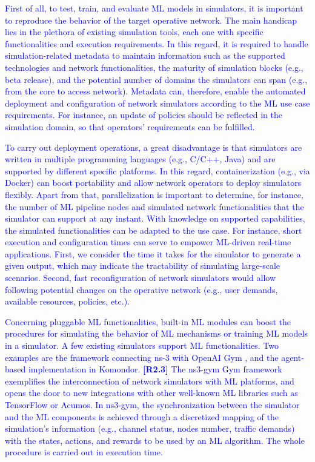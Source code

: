 \documentclass[journal]{IEEEtran}
\begin{document}
	\textcolor{blue}{First of all, to test, train, and evaluate ML models in simulators, it is important to reproduce the behavior of the target operative network. The main handicap lies in the plethora of existing simulation tools, each one with specific functionalities and execution requirements. In this regard, it is required to handle simulation-related metadata to maintain information such as the supported technologies and network functionalities, the maturity of simulation blocks (e.g., beta release), and the potential number of domains the simulators can span (e.g., from the core to access network). Metadata can, therefore, enable the automated deployment and configuration of network simulators according to the ML use case requirements. For instance, an update of policies should be reflected in the simulation domain, so that operators' requirements can be fulfilled.}
	
	\textcolor{blue}{To carry out deployment operations, a great disadvantage is that simulators are written in multiple programming languages (e.g., C/C++, Java) and are supported by different specific platforms. In this regard, containerization (e.g., via Docker) can boost portability and allow network operators to deploy simulators flexibly. Apart from that, parallelization is important to determine, for instance, the number of ML pipeline nodes and simulated network functionalities that the simulator can support at any instant.} \textcolor{blue}{With knowledge on supported capabilities, the simulated functionalities can be adapted to the use case. For instance, short execution and configuration times can serve to empower ML-driven real-time applications. First, we consider the time it takes for the simulator to generate a given output, which may indicate the tractability of simulating large-scale scenarios. Second, fast reconfiguration of network simulators would allow following potential changes on the operative network (e.g., user demands, available resources, policies, etc.).} 
 		
	\textcolor{blue}{Concerning pluggable ML functionalities, built-in ML modules can boost the procedures for simulating the behavior of ML mechanisms or training ML models in a simulator. A few existing simulators support ML functionalities. Two examples are the framework connecting ns-3 with OpenAI Gym \cite{gawlowicz2019ns}, and the agent-based implementation in Komondor. \textbf{[R2.3]} The ns3-gym Gym framework exemplifies the interconnection of network simulators with ML platforms, and opens the door to new integrations with other well-known ML libraries such as TensorFlow or Acumos. In ns3-gym, the synchronization between the simulator and the ML components is achieved through a discretized mapping of the simulation's information (e.g., channel status, nodes number, traffic demands) with the states, actions, and rewards to be used by an ML algorithm. The whole procedure is carried out in execution time.}
		    
\end{document}
